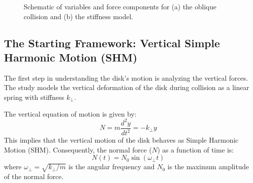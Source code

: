 \documentclass[11pt,letterpaper]{article}
\begin{document}
\begin{figure}[h!]
\caption{Schematic of variables and force components for (a) the oblique collision and (b) the stiffness model.}
\label{fig:collision_vars}
\end{figure}

\subsection{The Starting Framework: Vertical Simple Harmonic Motion (SHM)}
The first step in understanding the disk's motion is analyzing the vertical forces. The study models the vertical deformation of the disk during collision as a linear spring with stiffness $k_{\perp}$.

\noindent The vertical equation of motion is given by:
\begin{equation}
N = m \frac{d^2 y}{dt^2} = -k_{\perp} y
\end{equation}
This implies that the vertical motion of the disk behaves as Simple Harmonic Motion (SHM). Consequently, the normal force ($N$) as a function of time is:
\begin{equation}
N(t) = N_0 \sin(\omega_{\perp} t)
\end{equation}
where $\omega_{\perp} = \sqrt{k_{\perp}/m}$ is the angular frequency and $N_0$ is the maximum amplitude of the normal force.
\end{document}
